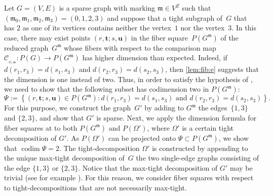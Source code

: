 \documentclass[12pt]{article}
\theoremstyle{definition}
\newtheorem{remark}[lemma]{Remark}
\newcommand{\RL}[2]{\Cref{lem:#1}\ref{lem:#1:#2}}
\newcommand{\st}{such that }
\newcommand{\wrt}{with respect to }
\renewcommand{\c}{\colon}
\newcommand{\set}[2]{\left\{#1:#2\right\}}
\newcommand{\codim}{\operatorname{codim}}
\newcommand{\cC}{\mathcal{C}}
\newcommand{\bt}{\mathbf{t}}
\newcommand{\bu}{\mathbf{u}}
\newcommand{\m}{\mathfrak{m}}
\newcommand{\sd}{d} %
\newcommand{\CM}{\cC_{_{G,\m}}}
\begin{document}
Let $G=(V,E)$ is a sparse graph with marking $\m\in V^Z$
\st $(\m_0,\m_1,\m_2,\m_3)=(0,1,2,3)$
and suppose that a tight subgraph of~$G$ that has $2$ as one of its vertices
contains neither the vertex~$1$ nor the vertex~$3$.
In this case, there may exist points $(r,\bt;s,\bu)$ in the fiber square~$P(G^\m)$
of the reduced graph~$G^\m$
whose fibers \wrt the comparison map $\CM\c P(G)\to P(G^\m)$
has higher dimension than expected.
Indeed, if
$d(r_1,r_3)=d(s_1,s_3)$ and $d(r_2,r_3)=d(s_2,s_3)$, then \RL{fib}{e}
suggests that the dimension is one instead of two.
Thus, in order to satisfy the hypothesis of ,
we need to show that the following subset has codimension two in $P(G^\m)$:
\[
\Psi:=\set{(r,\bt;s,\bu)\in P(G^\m)}{\sd(r_1,r_3)=\sd(s_1,s_3) \text{ and } \sd(r_2,r_3)=\sd(s_2,s_3)}.
\]
For this purpose, we construct the graph~$G'$ by
adding to $G^\m$ the edges~$\{1,3\}$ and $\{2,3\}$,
and show that $G'$ is sparse.
Next, we apply the dimension formula for fiber squares at 
to both $P(G^\m)$ and $P(\Omega')$,
where $\Omega'$ is a certain tight decomposition of $G'$.
As $P(\Omega')$ can be projected onto $\Psi\subset P(G^\m)$, we show that $\codim\Psi=2$.
The tight-decomposition $\Omega'$ is constructed by appending to the unique max-tight decomposition of~$G$
the two single-edge graphs consisting of the edge $\{1,3\}$ or $\{2,3\}$.
Notice that the max-tight decomposition of $G'$ may be trivial (see for example ).
For this reason, we consider fiber squares \wrt tight-decompositions that are not necessarily max-tight.
%
\end{document}

